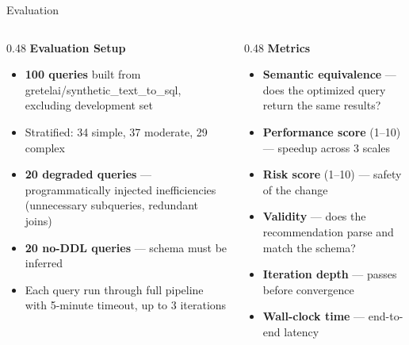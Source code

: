 \documentclass[10pt,aspectratio=169]{beamer}
\newcommand{\Raleway}{\sffamily}
\begin{document}

\begin{frame}{Evaluation}
  \begin{columns}[T]

    \begin{column}{0.48\textwidth}
      {\small\Raleway\bfseries\color{aggieblue} Evaluation Setup}\\[0.4em]
      \footnotesize
      \begin{itemize}
        \setlength{\itemsep}{0.3em}
        \item \textbf{100 queries} built from gretelai/synthetic\_text\_to\_sql, excluding development set
        \item Stratified: 34 simple, 37 moderate, 29 complex
        \item \textbf{20 degraded queries} --- programmatically injected inefficiencies (unnecessary subqueries, redundant joins)
        \item \textbf{20 no-DDL queries} --- schema must be inferred
        \item Each query run through full pipeline with 5-minute timeout, up to 3 iterations
      \end{itemize}
    \end{column}

    \begin{column}{0.48\textwidth}
      {\small\Raleway\bfseries\color{aggieblue} Metrics}\\[0.4em]
      \footnotesize
      \begin{itemize}
        \setlength{\itemsep}{0.3em}
        \item \textbf{Semantic equivalence} --- does the optimized query return the same results?
        \item \textbf{Performance score} (1--10) --- speedup across 3 scales
        \item \textbf{Risk score} (1--10) --- safety of the change
        \item \textbf{Validity} --- does the recommendation parse and match the schema?
        \item \textbf{Iteration depth} --- passes before convergence
        \item \textbf{Wall-clock time} --- end-to-end latency
      \end{itemize}
    \end{column}

  \end{columns}
\end{frame}
\end{document}
